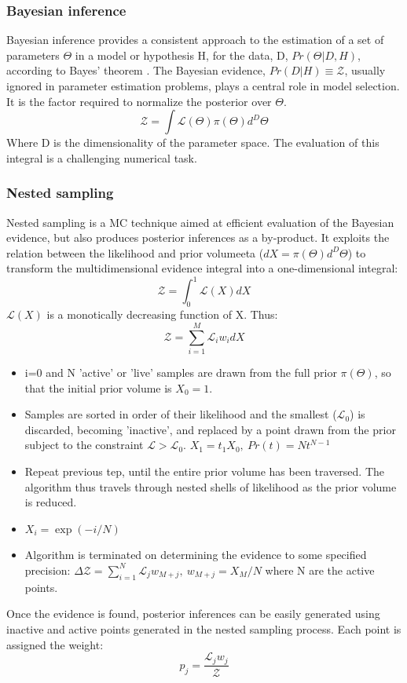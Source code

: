 \subsubsection{Bayesian inference}
Bayesian inference provides a consistent approach to the estimation of a set of parameters $\Theta$ in a model or hypothesis H, for the data, D, $Pr(\Theta|D,H)$, according to Bayes' theorem . 
The Bayesian evidence, $Pr(D|H) \equiv \mathcal{Z}$, usually ignored in parameter estimation problems, plays a central role in model selection. It is the factor required to normalize the posterior over $\Theta$. 
\begin{equation}
\mathcal{Z} = \int \mathcal{L}(\Theta) \pi(\Theta)d^D\Theta
\end{equation}
Where D is the dimensionality of the parameter space. The evaluation of this integral is a challenging numerical task. %

\subsubsection{Nested sampling}
Nested sampling is a MC technique aimed at efficient evaluation of the Bayesian evidence, but also produces posterior inferences as a by-product. 
It exploits the relation between the likelihood and prior volumeeta ($dX = \pi(\Theta)d^D\Theta$) to transform the multidimensional evidence integral into a one-dimensional integral:
\begin{equation}
\mathcal{Z} = \int_0^1 \mathcal{L}(X) dX
\end{equation}
$\mathcal{L}(X)$ is a monotically decreasing function of X. Thus:
\begin{equation}
\mathcal{Z} = \sum_{i=1}^M \mathcal{L}_i w_i dX
\end{equation}

\begin{itemize}
\item i=0 and N 'active' or 'live' samples are drawn from the full prior $\pi(\Theta)$, so that the initial prior volume is $X_0 = 1$.
\item Samples are sorted in order of their likelihood and the smallest ($\mathcal{L}_0$) is discarded, becoming 'inactive', and replaced by a point drawn from the prior subject to the constraint $\mathcal{L} > \mathcal{L}_0$. $X_1 = t_1 X_0, \ Pr(t) = Nt^{N-1}$
\item Repeat previous tep, until the entire prior volume has been traversed. The algorithm thus travels through nested shells of likelihood as the prior volume is reduced. 
\item $X_i = \exp{(-i/N)}$
\item Algorithm is terminated on determining the evidence to some specified precision:
$\Delta \mathcal{Z} = \sum_{i=1}^N \mathcal{L}_j w_{M+j}, \ w_{M+j} = X_M / N$
where N are the active points. 
\end{itemize}
Once the evidence is found, posterior inferences can be easily generated using inactive and active points generated in the nested sampling process. Each point is assigned the weight:
\begin{equation}
p_j = \frac{\mathcal{L}_j w_j}{\mathcal{Z}}
\end{equation}

